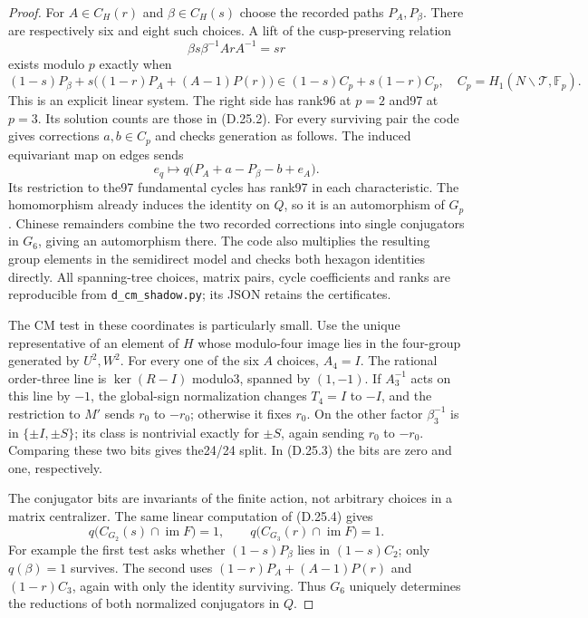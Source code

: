 \begin{proof}
For $A\in C_H(r)$ and $\beta\in C_H(s)$ choose the recorded
paths $P_A,P_\beta$. There are respectively six and eight such
choices. A lift of the cusp-preserving relation
\[
 \beta s\beta^{-1}A rA^{-1}=sr
\]
exists modulo $p$ exactly when
\[
 (1-s)P_\beta+
 s\bigl((1-r)P_A+(A-1)P(r)\bigr)
 \in (1-s)C_p+s(1-r)C_p,\quad
 C_p=H_1(N\backslash\mathcal T,\mathbb F_p).               \tag{D.25.5}
\]
This is an explicit linear system. The right side has rank96
at $p=2$ and97 at $p=3$. Its solution counts are those in
(D.25.2). For every surviving pair the code gives corrections
$a,b\in C_p$ and checks generation as follows. The induced
equivariant map on edges sends
\[
 e_q\longmapsto q\bigl(P_A+a-P_\beta-b+e_A\bigr).
\]
Its restriction to the97 fundamental cycles has rank97 in
each characteristic. The homomorphism already induces the
identity on $Q$, so it is an automorphism of $G_p$.
Chinese remainders combine the two recorded corrections into
single conjugators in $G_6$, giving an automorphism there.
The code also multiplies the resulting group elements in
the semidirect model and checks both hexagon identities
directly. All spanning-tree choices, matrix pairs, cycle
coefficients and ranks are reproducible from
\texttt{d\_cm\_shadow.py}; its JSON retains the certificates.

The CM test in these coordinates is particularly small.
Use the unique representative of an element of $H$ whose
modulo-four image lies in the four-group generated by
$U^2,W^2$. For every one of the six $A$ choices, $A_4=I$.
The rational order-three line is $\ker(R-I)$ modulo3, spanned
by $(1,-1)$. If $A_3^{-1}$ acts on this line by $-1$, the
global-sign normalization changes $T_4=I$ to $-I$, and the
restriction to $M'$ sends $r_0$ to $-r_0$; otherwise it fixes
$r_0$. On the other factor $\beta_3^{-1}$ is in
$\{\pm I,\pm S\}$; its class is nontrivial exactly for
$\pm S$, again sending $r_0$ to $-r_0$. Comparing these two
bits gives the24/24 split. In (D.25.3) the bits are zero and
one, respectively.

The conjugator bits are invariants of the finite action,
not arbitrary choices in a matrix centralizer. The same
linear computation of (D.25.4) gives
\[
 q\bigl(C_{G_2}(s)\cap\operatorname{im}F\bigr)=1,
 \qquad
 q\bigl(C_{G_3}(r)\cap\operatorname{im}F\bigr)=1.          \tag{D.25.6}
\]
For example the first test asks whether
$(1-s)P_\beta$ lies in $(1-s)C_2$; only $q(\beta)=1$
survives. The second uses
$(1-r)P_A+(A-1)P(r)$ and $(1-r)C_3$, again with only the
identity surviving. Thus $G_6$ uniquely determines the
reductions of both normalized conjugators in $Q$.


\end{proof}
